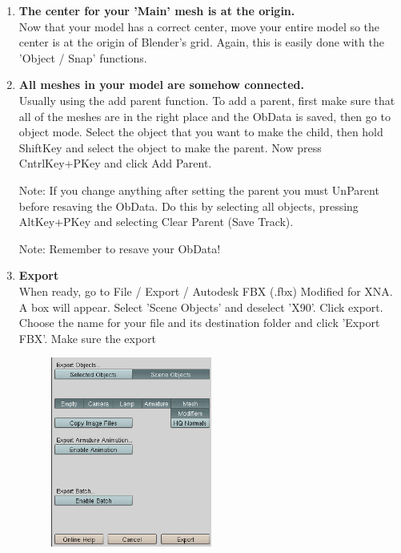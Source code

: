 \begin {enumerate}
Note: Keep in mind that this method puts the center at the location of the empty mesh. This might not be exactly where you want your model to rotate. Use your best judgment. 

Method 2: The previous way makes it easier to place your center in the right place if your mesh is relatively balanced. Another way to place your center is to get your cursor where you want your center to be and then select your main mesh, enter 'Edit Mode', open the 'Editing Panel'(F9) and go to 'Mesh Panel / Center Cursor'. This will place the objects new center wherever you placed your cursor. You can use the 'Object / Snap' functions to make this a lot easier.

Note: Remember to re save your ObData!

\item {\bf The center for your 'Main' mesh is at the origin.}\\
Now that your model has a correct center, move your entire model so the center is at the origin of Blender's grid. Again, this is easily done with the 'Object / Snap' functions. 

\item {\bf All meshes in your model are somehow connected.}\\
Usually using the add parent function. To add a parent, first make sure that all of the meshes are in the right place and the ObData is saved, then go to object mode. Select the object that you want to make the child, then hold ShiftKey and select the object to make the parent. Now press CntrlKey+PKey and click Add Parent. 

Note: If you change anything after setting the parent you must UnParent before resaving the ObData. Do this by selecting all objects, pressing AltKey+PKey and selecting Clear Parent (Save Track).

Note: Remember to resave your ObData!

\item {\bf Export}\\
When ready, go to  File / Export / Autodesk FBX (.fbx) Modified for XNA. A box will appear. Select 'Scene Objects' and deselect 'X90'. Click export. Choose the name for your file and its destination folder and click 'Export FBX'. Make sure the export 
\begin{figure}[h]
	\centering
		\includegraphics[width=0.50\textwidth]{Figures/ExportFBX.png}
	\label{fig:ExportFBX}
\end{figure}



\end{enumerate}
